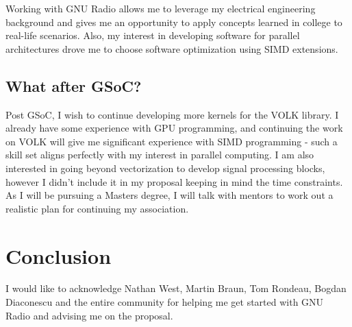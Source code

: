 \documentclass[a4paper,12pt,oneside]{article}
\begin{document}
Working with GNU Radio allows me to leverage my electrical engineering background and gives me an opportunity to apply concepts learned in college to real-life scenarios. Also, my interest in developing software for parallel architectures drove me to choose software optimization using SIMD extensions.

\subsection{What after GSoC?}

Post GSoC, I wish to continue developing more kernels for the VOLK library. I already have some experience with GPU programming, and continuing the work on VOLK will give me significant experience with SIMD programming - such a skill set aligns perfectly with my interest in parallel computing. I am also interested in going beyond vectorization to develop signal processing blocks, however I didn't include it in my proposal keeping in mind the time constraints. As I will be pursuing a Masters degree, I will talk with mentors to work out a realistic plan for continuing my association.
 
\section{Conclusion}
I would like to acknowledge Nathan West, Martin Braun, Tom Rondeau, Bogdan Diaconescu and the entire community for helping me get started with GNU Radio and advising me on the proposal. 

\newpage

\end{document}
